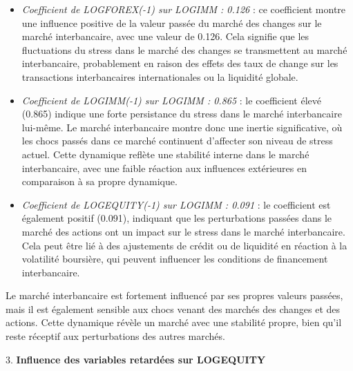 \begin{itemize}
    \item \textit{Coefficient de LOGFOREX(-1) sur LOGIMM : 0.126} : ce coefficient montre une influence positive de la valeur passée du marché des changes sur le marché interbancaire, avec une valeur de 0.126. Cela signifie que les fluctuations du stress dans le marché des changes se transmettent au marché interbancaire, probablement en raison des effets des taux de change sur les transactions interbancaires internationales ou la liquidité globale.
    \item \textit{Coefficient de LOGIMM(-1) sur LOGIMM : 0.865} : le coefficient élevé (0.865) indique une forte persistance du stress dans le marché interbancaire lui-même. Le marché interbancaire montre donc une inertie significative, où les chocs passés dans ce marché continuent d'affecter son niveau de stress actuel. Cette dynamique reflète une stabilité interne dans le marché interbancaire, avec une faible réaction aux influences extérieures en comparaison à sa propre dynamique.
    \item \textit{Coefficient de LOGEQUITY(-1) sur LOGIMM : 0.091} : le coefficient est également positif (0.091), indiquant que les perturbations passées dans le marché des actions ont un impact sur le stress dans le marché interbancaire. Cela peut être lié à des ajustements de crédit ou de liquidité en réaction à la volatilité boursière, qui peuvent influencer les conditions de financement interbancaire.
\end{itemize}

Le marché interbancaire est fortement influencé par ses propres valeurs passées, mais il est également sensible aux chocs venant des marchés des changes et des actions. Cette dynamique révèle un marché avec une stabilité propre, bien qu’il reste réceptif aux perturbations des autres marchés.

\vspace{0.5cm}

3. \textbf{Influence des variables retardées sur LOGEQUITY}

